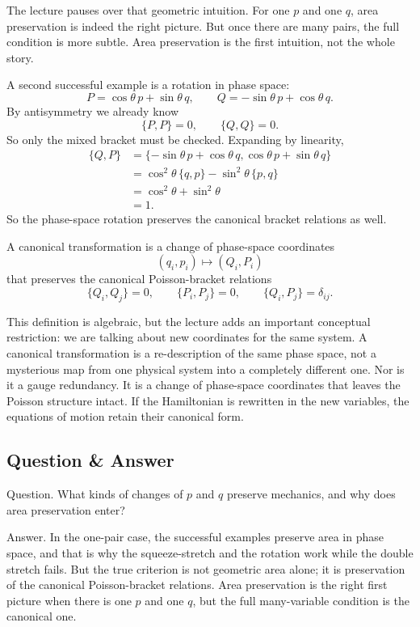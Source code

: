 The lecture pauses over that geometric intuition. For one \(p\) and one \(q\), area preservation is indeed the right picture. But once there are many pairs, the full condition is more subtle. Area preservation is the first intuition, not the whole story.

A second successful example is a rotation in phase space:
\begin{equation}
P=\cos\theta\,p+\sin\theta\,q,\qquad
Q=-\sin\theta\,p+\cos\theta\,q.
\end{equation}
By antisymmetry we already know
\[
\{P,P\}=0,\qquad \{Q,Q\}=0.
\]
So only the mixed bracket must be checked. Expanding by linearity,
\begin{align}
\{Q,P\}
&=\{-\sin\theta\,p+\cos\theta\,q,\cos\theta\,p+\sin\theta\,q\} \\
&=\cos^2\theta\,\{q,p\}-\sin^2\theta\,\{p,q\} \\
&=\cos^2\theta+\sin^2\theta \\
&=1.
\end{align}
So the phase-space rotation preserves the canonical bracket relations as well.

\begin{definition}
A canonical transformation is a change of phase-space coordinates
\[
(q_i,p_i)\longmapsto (Q_i,P_i)
\]
that preserves the canonical Poisson-bracket relations
\[
\{Q_i,Q_j\}=0,\qquad \{P_i,P_j\}=0,\qquad \{Q_i,P_j\}=\delta_{ij}.
\]
\end{definition}

This definition is algebraic, but the lecture adds an important conceptual restriction: we are talking about new coordinates for the same system. A canonical transformation is a re-description of the same phase space, not a mysterious map from one physical system into a completely different one. Nor is it a gauge redundancy. It is a change of phase-space coordinates that leaves the Poisson structure intact. If the Hamiltonian is rewritten in the new variables, the equations of motion retain their canonical form.

\subsection{Question \& Answer}

Question. What kinds of changes of \(p\) and \(q\) preserve mechanics, and why does area preservation enter?

Answer. In the one-pair case, the successful examples preserve area in phase space, and that is why the squeeze-stretch and the rotation work while the double stretch fails. But the true criterion is not geometric area alone; it is preservation of the canonical Poisson-bracket relations. Area preservation is the right first picture when there is one \(p\) and one \(q\), but the full many-variable condition is the canonical one.

